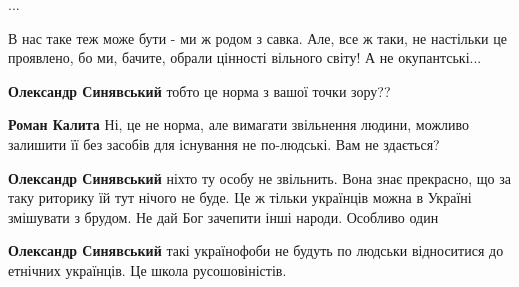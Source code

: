 \begin{itemize}
\begin{itemize}
\begin{itemize}
...

В нас таке теж може бути - ми ж родом з савка. Але, все ж таки, не настільки це
проявлено, бо ми, бачите, обрали цінності вільного світу! А не окупантські...

\end{itemize}

 
\textbf{Олександр Синявський} тобто це норма з вашої точки зору??

\begin{itemize}
 
\textbf{Роман Калита} Ні, це не норма, але вимагати звільнення людини, можливо
залишити її без засобів для існування не по-людські. Вам не здається?

 
\textbf{Олександр Синявський} ніхто ту особу не звільнить. Вона знає прекрасно,
що за таку риторику їй тут нічого не буде. Це ж тільки українців можна в
Україні змішувати з брудом. Не дай Бог зачепити інші народи. Особливо один

 
\textbf{Олександр Синявський} такі українофоби не будуть по людськи відноситися до етнічних українців. Це школа русошовіністів.

 

\end{itemize}
\end{itemize}
\end{itemize}
